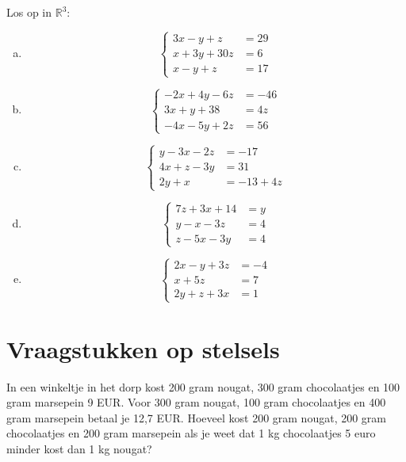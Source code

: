 \documentclass[12pt,twoside]{article}
\begin{document}
\begin{oefening}
Los op in $\mathbb{R}^3$:
\begin{multicols}{2}
\begin{enumerate}[(a)]
  \item$$\left\{
    \begin{aligned}
      3x -  y +  z &= 29\\
      x  + 3y +30z &=  6\\
      x  -  y +  z &= 17
    \end{aligned}\right.$$
  \item$$\left\{
    \begin{aligned}
      -2x + 4y - 6z &= -46\\
       3x +  y + 38 &= 4z\\
      -4x - 5y + 2z &= 56
    \end{aligned}\right.$$
  \item$$\left\{
    \begin{aligned}
       y - 3x - 2z &= -17\\
      4x +  z - 3y &= 31\\
      2y +  x &= -13 + 4z
    \end{aligned}\right.$$
  \item$$\left\{
    \begin{aligned}
      7z + 3x + 14 &= y\\
       y -  x - 3z &= 4\\
       z - 5x - 3y &= 4
    \end{aligned}\right.$$
  \item$$\left\{
    \begin{aligned}
      2x -  y + 3z &= -4\\
       x + 5z      &= 7\\
      2y +  z + 3x &= 1
    \end{aligned}\right.$$
\end{enumerate}
\end{multicols}
\end{oefening}

\pagebreak
\section{Vraagstukken op stelsels}

\begin{oefening}
In een winkeltje in het dorp kost 200 gram nougat, 300 gram chocolaatjes en 100 gram marsepein
9 EUR.  Voor 300 gram nougat, 100 gram chocolaatjes en 400 gram marsepein betaal je 12,7 EUR.
Hoeveel kost 200 gram nougat, 200 gram chocolaatjes en 200 gram marsepein als je weet dat
1 kg chocolaatjes 5 euro minder kost dan 1 kg nougat?
\end{oefening}
\end{document}
